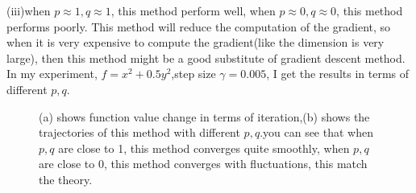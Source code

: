 \documentclass[12pt,a4paper]{article}
\begin{document}
	(iii)when $p\approx 1,q\approx 1$, this method perform well, when $p\approx 0,q\approx 0$, this method performs poorly. This method will reduce the computation of the gradient, so when it is very expensive to compute the gradient(like the dimension is very large), then this method might be a good substitute of gradient descent method.
	In my experiment,  $f=x^2+0.5y^2$,step size $\gamma = 0.005$, I get the results in terms of different $p,q$. 
	
	\begin{figure}
		\centering
		
		
		\caption{ (a) shows function value change in terms of iteration,(b)  shows the trajectories of this method with different $p,q$.you can see that when $p,q$ are close to 1,  this method converges quite smoothly, when $p,q$ are close to 0, this method converges with fluctuations, this match the theory.} %
		\label{img2}
	\end{figure}
	
	
	
	
	
	
	
	
	
	
	
	
	
	
	
	
	
	
	
	
	
	
	
	
	
	
	
	
	
\end{document}

